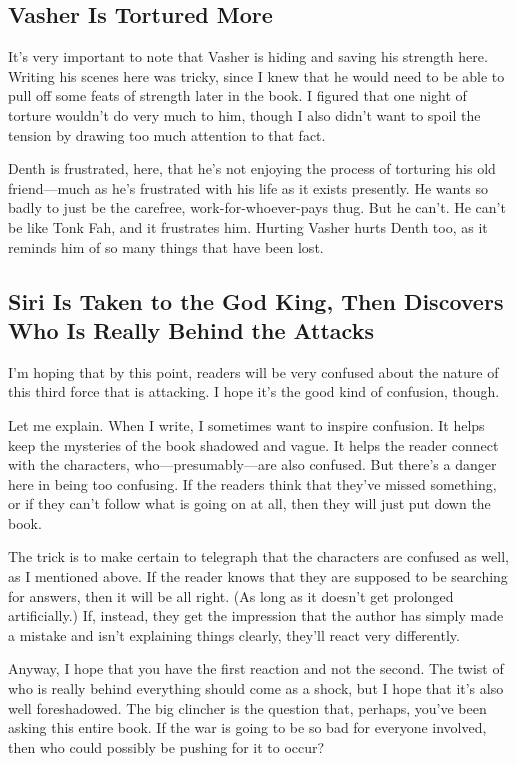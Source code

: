 \subsection*{Vasher Is Tortured More}

It’s very important to note that Vasher is hiding and saving his strength here. Writing his scenes here was tricky, since I knew that he would need to be able to pull off some feats of strength later in the book. I figured that one night of torture wouldn’t do very much to him, though I also didn’t want to spoil the tension by drawing too much attention to that fact.

Denth is frustrated, here, that he’s not enjoying the process of torturing his old friend—much as he’s frustrated with his life as it exists presently. He wants so badly to just be the carefree, work-for-whoever-pays thug. But he can’t. He can’t be like Tonk Fah, and it frustrates him. Hurting Vasher hurts Denth too, as it reminds him of so many things that have been lost.

\subsection*{Siri Is Taken to the God King, Then Discovers Who Is Really Behind the Attacks}

I’m hoping that by this point, readers will be very confused about the nature of this third force that is attacking. I hope it’s the good kind of confusion, though.

Let me explain. When I write, I sometimes want to inspire confusion. It helps keep the mysteries of the book shadowed and vague. It helps the reader connect with the characters, who—presumably—are also confused. But there’s a danger here in being too confusing. If the readers think that they’ve missed something, or if they can’t follow what is going on at all, then they will just put down the book.

The trick is to make certain to telegraph that the characters are confused as well, as I mentioned above. If the reader knows that they are supposed to be searching for answers, then it will be all right. (As long as it doesn’t get prolonged artificially.) If, instead, they get the impression that the author has simply made a mistake and isn’t explaining things clearly, they’ll react very differently.

Anyway, I hope that you have the first reaction and not the second. The twist of who is really behind everything should come as a shock, but I hope that it’s also well foreshadowed. The big clincher is the question that, perhaps, you’ve been asking this entire book. If the war is going to be so bad for everyone involved, then who could possibly be pushing for it to occur?

